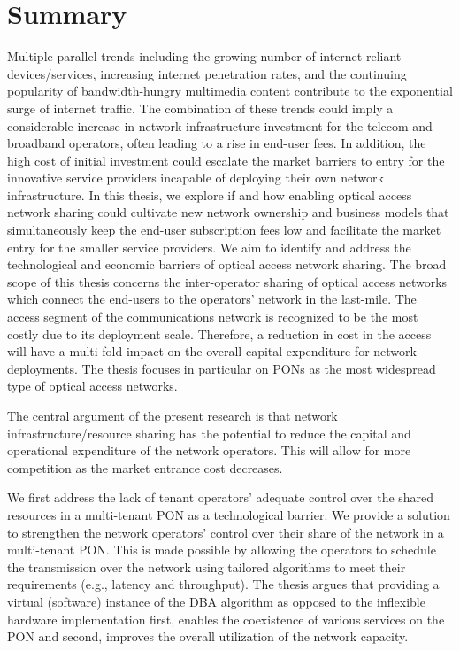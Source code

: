 \chapter*{Summary}



Multiple parallel trends including the growing number of internet reliant devices/services, increasing internet penetration rates, and the continuing popularity of bandwidth-hungry multimedia content contribute to the exponential surge of internet traffic. The combination of these trends could imply a considerable increase in network infrastructure investment for the telecom and broadband operators, often leading to a rise in end-user fees. In addition, the high cost of initial investment could escalate the market barriers to entry for the innovative service providers incapable of deploying their own network infrastructure. In this thesis, we explore if and how enabling optical access network sharing could cultivate new network ownership and business models that simultaneously keep the end-user subscription fees low and facilitate the market entry for the smaller service providers. We aim to identify and address the technological and economic barriers of optical access network sharing.
The broad scope of this thesis concerns the inter-operator sharing of optical access networks which connect the end-users to the operators' network in the last-mile. The access segment of the communications network is recognized to be the most costly due to its deployment scale. Therefore, a reduction in cost in the access will have a multi-fold impact on the overall capital expenditure for network deployments. The thesis focuses in particular on \acp{PON} as the most widespread type of optical access networks. 

The central argument of the present research is that network infrastructure/resource sharing has the potential to reduce the capital and operational expenditure of the network operators. This will allow for more competition as the market entrance cost decreases.

We first address the lack of tenant operators' adequate control over the shared resources in a multi-tenant \ac{PON} as a technological barrier. We provide a solution to strengthen the network operators' control over their share of the network in a multi-tenant \ac{PON}. This is made possible by allowing the operators to schedule the transmission over the network using tailored algorithms to meet their requirements (e.g., latency and throughput). The thesis argues that providing a virtual (software) instance of the \ac{DBA} algorithm as opposed to the inflexible hardware implementation first, enables the coexistence of various services on the \ac{PON} and second, improves the overall utilization of the network capacity. 


